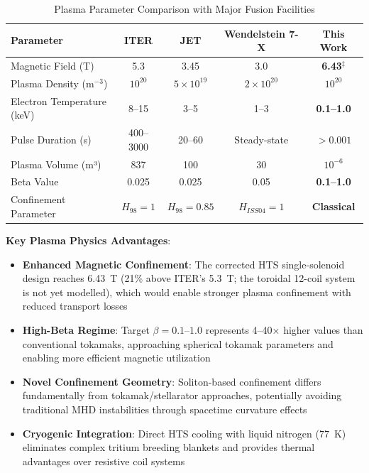 \documentclass[12pt,a4paper]{article}
\begin{document}
\begin{table}[htbp]
\centering
\caption{Plasma Parameter Comparison with Major Fusion Facilities}
\label{tab:fusion_comparison}
\begin{tabular}{@{}lcccc@{}}
\toprule
Parameter & ITER & JET & Wendelstein 7-X & \textbf{This Work} \\
\midrule
Magnetic Field (T) & 5.3 & 3.45 & 3.0 & \textbf{6.43}$^\ddagger$ \\
Plasma Density (m$^{-3}$) & $10^{20}$ & $5 \times 10^{19}$ & $2 \times 10^{20}$ & \textbf{$10^{20}$} \\
Electron Temperature (keV) & 8--15 & 3--5 & 1--3 & \textbf{0.1--1.0} \\
Pulse Duration (s) & 400--3000 & 20--60 & Steady-state & \textbf{$>0.001$} \\
Plasma Volume (m³) & 837 & 100 & 30 & \textbf{$10^{-6}$} \\
Beta Value & 0.025 & 0.025 & 0.05 & \textbf{0.1--1.0} \\
Confinement Parameter & $H_{98} = 1$ & $H_{98} = 0.85$ & $H_{ISS04} = 1$ & \textbf{Classical} \\
\bottomrule
\end{tabular}
\par{}
\end{table}

\textbf{Key Plasma Physics Advantages}:
\begin{itemize}
\item \textbf{Enhanced Magnetic Confinement}: The corrected HTS single-solenoid design reaches 6.43~T (21\% above ITER's 5.3~T; the toroidal 12-coil system is not yet modelled), which would enable stronger plasma confinement with reduced transport losses
\item \textbf{High-Beta Regime}: Target $\beta = 0.1$--$1.0$ represents 4--40× higher values than conventional tokamaks, approaching spherical tokamak parameters and enabling more efficient magnetic utilization
\item \textbf{Novel Confinement Geometry}: Soliton-based confinement differs fundamentally from tokamak/stellarator approaches, potentially avoiding traditional MHD instabilities through spacetime curvature effects
\item \textbf{Cryogenic Integration}: Direct HTS cooling with liquid nitrogen (77~K) eliminates complex tritium breeding blankets and provides thermal advantages over resistive coil systems
\end{itemize}
\end{document}
